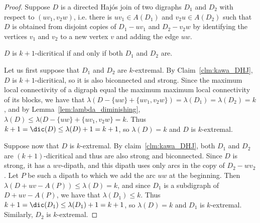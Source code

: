 \begin{proof}
    Suppose $D$ is a directed Haj\'os join of two digraphs $D_1$ and $D_2$ with respect to $(uv_1, v_2w)$, i.e. there is $uv_1 \in A(D_1)$ and $v_2u \in A(D_2)$ such that $D$ is obtained from disjoint copies of $D_1-uv_1$ and $D_2-v_2w$ by identifying the vertices $v_1$ and $v_2$ to a new vertex $v$ and adding the edge $uw$. 

    \begin{claim}\label{clm:kawa_DHJ}
        $D$ is $k+1$-dicritical if and only if both $D_1$ and $D_2$ are. 
    \end{claim}
    
    Let us first suppose that $D_1$ and $D_2$ are $k$-extremal.  
    By Claim~\ref{clm:kawa_DHJ}, $D$ is $k+1$-dicritical, so it is also biconnected and strong. Since the maximum local connectivity of a digraph equal the maximum maximum local connectivity of its blocks, we have that  $\lambda(D-\{uw\} + \{uv_1, v_2w\}) =\lambda(D_1) = \lambda(D_2) = k$, and by Lemma~\ref{lem:lambda_diminishing}, $\lambda(D) \leq \lambda(D-\{uw\} + \{uv_1, v_2w\} =  k$. Thus $k +1 = \dic(D) \leq \lambda(D) + 1 = k+1 $, so $\lambda(D) = k$ and $D$ is $k$-extremal. 
    


    Suppose now that $D$ is $k$-extremal. 
    By claim~\ref{clm:kawa_DHJ}, both $D_1$ and $D_2$ are $(k+1)$-dicritical and thus are also strong and biconnected. 
    Since $D$ is strong, it has a $wv$-dipath, and this dipath uses only arcs in the copy of $D_2 -wv_2$. Let $P$ be such a dipath to which we add the arc $uw$ at the beginning. 
    Then $\lambda(D + uv - A(P)) \leq \lambda(D) = k$, and since $D_1$ is a subdigraph of $D + uv - A(P)$, we have that $\lambda(D_1) \leq k$. Thus  $k +1 = \dic(D_1) \leq \lambda(D_1) + 1 = k+1 $, so $\lambda(D) = k$ and $D_1$ is $k$-extremal. Similarly, $D_2$ is $k$-extremal. 
\end{proof}

